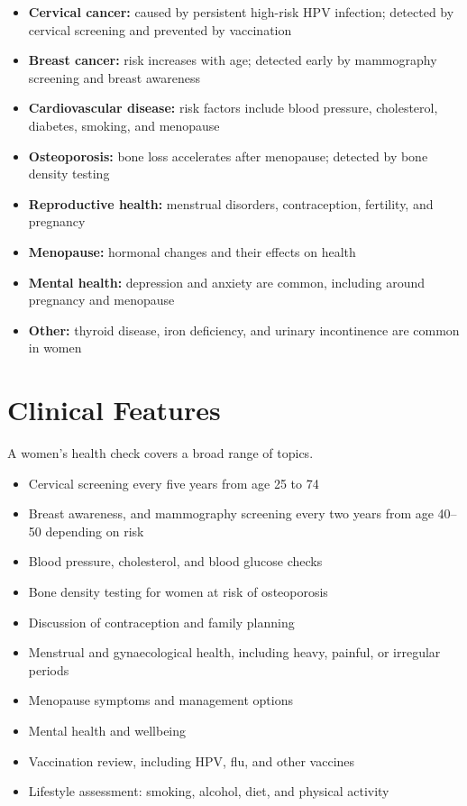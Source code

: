 \begin{itemize}
    \item \textbf{Cervical cancer:} caused by persistent high-risk HPV infection; detected by cervical screening and prevented by vaccination
    \item \textbf{Breast cancer:} risk increases with age; detected early by mammography screening and breast awareness
    \item \textbf{Cardiovascular disease:} risk factors include blood pressure, cholesterol, diabetes, smoking, and menopause
    \item \textbf{Osteoporosis:} bone loss accelerates after menopause; detected by bone density testing
    \item \textbf{Reproductive health:} menstrual disorders, contraception, fertility, and pregnancy
    \item \textbf{Menopause:} hormonal changes and their effects on health
    \item \textbf{Mental health:} depression and anxiety are common, including around pregnancy and menopause
    \item \textbf{Other:} thyroid disease, iron deficiency, and urinary incontinence are common in women
\end{itemize}

\section*{Clinical Features}
A women's health check covers a broad range of topics.

\begin{itemize}
    \item Cervical screening every five years from age 25 to 74
    \item Breast awareness, and mammography screening every two years from age 40--50 depending on risk
    \item Blood pressure, cholesterol, and blood glucose checks
    \item Bone density testing for women at risk of osteoporosis
    \item Discussion of contraception and family planning
    \item Menstrual and gynaecological health, including heavy, painful, or irregular periods
    \item Menopause symptoms and management options
    \item Mental health and wellbeing
    \item Vaccination review, including HPV, flu, and other vaccines
    \item Lifestyle assessment: smoking, alcohol, diet, and physical activity
\end{itemize}

